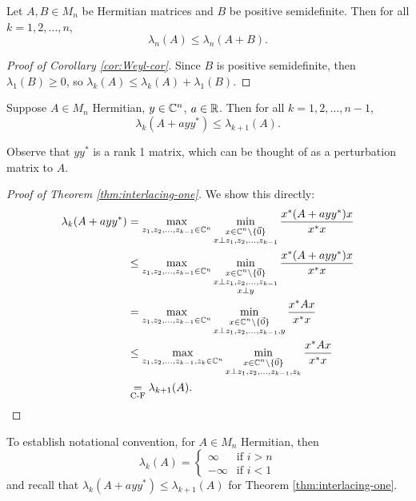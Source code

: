 \begin{corollary}
\label{cor:Weyl-cor}
Let $A, B \in M_n$ be Hermitian matrices and $B$ be positive semidefinite. Then for all $k = 1, 2, \dots, n$,
$$
\lambda_n(A) \leq \lambda_n(A+B).
$$
\end{corollary}

\begin{proof}[Proof of Corollary \ref{cor:Weyl-cor}]
Since $B$ is positive semidefinite, then $\lambda_1(B) \geq 0$, so $\lambda_k(A) \leq \lambda_k(A) + \lambda_1(B)$.
\end{proof}

\begin{theorem}[Interlacing I]
\label{thm:interlacing-one}
Suppose $A \in M_n$ Hermitian, $y \in \mathbb C^n$, $a \in \mathbb R$. Then for all $k = 1, 2, \dots, n-1$,
$$
\lambda_k(A + ayy^*) \leq \lambda_{k+1}(A).
$$
\end{theorem}
Observe that $yy^*$ is a rank 1 matrix, which can be thought of as a perturbation matrix to $A$.

\begin{proof}[Proof of Theorem \ref{thm:interlacing-one}]
We show this directly:
\begin{align*}
    \lambda_k(A+ayy^*) 
        &= \max_{z_1, z_2, \dots, z_{k-1} \in \mathbb C^n} \min_{\substack{x \in \mathbb C^n \setminus \{\Vec{0}\} \\ x \perp z_1, z_2, \dots, z_{k-1}}} \frac{x^*(A + ayy^*)x}{x^*x} \\
        &\leq \max_{z_1, z_2, \dots, z_{k-1} \in \mathbb C^n} \min_{\substack{x \in \mathbb C^n \setminus \{\Vec{0}\} \\ x \perp z_1, z_2, \dots, z_{k-1} \\ x \perp y}} \frac{x^*(A + ayy^*)x}{x^*x} \\
        &= \max_{z_1, z_2, \dots, z_{k-1} \in \mathbb C^n} \min_{\substack{x \in \mathbb C^n \setminus \{\Vec{0}\} \\ x \perp z_1, z_2, \dots, z_{k-1}, y}} \frac{x^*Ax}{x^*x} \\
        &\leq \max_{z_1, z_2, \dots, z_{k-1}, z_k \in \mathbb C^n} \min_{\substack{x \in \mathbb C^n \setminus \{\Vec{0}\} \\ x \perp z_1, z_2, \dots, z_{k-1}, z_k}} \frac{x^*Ax}{x^*x} \\
        &\underset{\text{C-F}}{=} \lambda_{k+1}(A).
\end{align*}
\end{proof}

To establish notational convention, for $A \in M_n$ Hermitian, then
$$
\lambda_k(A) 
    = \begin{cases} 
        \infty & \text{if } i > n \\ 
        -\infty & \text{if } i < 1
    \end{cases}
$$
and recall that $\lambda_k(A+ayy^*) \leq \lambda_{k+1}(A)$ for Theorem \ref{thm:interlacing-one}.


